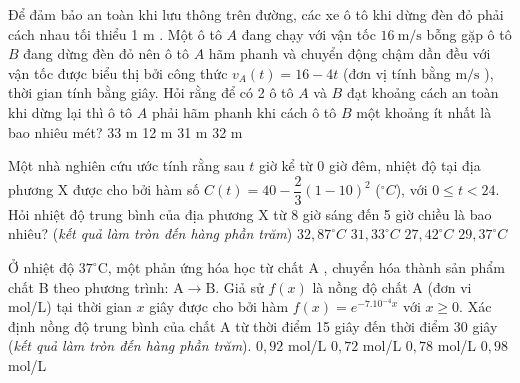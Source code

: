 \begin{ex}
	Để đảm bảo an toàn khi lưu thông trên đường, các xe ô tô khi dừng đèn đỏ phải cách nhau tối thiểu 1 m . Một ô tô $A$ đang chạy với vận tốc $16 \mathrm{~m} / \mathrm{s}$ bỗng gặp ô tô $B$ đang dừng đèn đỏ nên ô tô $A$ hãm phanh và chuyển động chậm dần đều với vận tốc được biểu thị bởi công thức $v_A(t)=16-4 t$ (đơn vị tính bằng $\mathrm{m} / \mathrm{s}$ ), thời gian tính bằng giây. Hỏi rằng để có 2 ô tô $A$ và $B$ đạt khoảng cách an toàn khi dừng lại thì ô tô $A$ phải hãm phanh khi cách ô tô $B$ một khoảng ít nhất là bao nhiêu mét?	
	\choice
	{33 m}
	{12 m}
	{31 m}
	{32 m}
\end{ex}
\begin{ex}
	Một nhà nghiên cứu ước tính rằng sau $t$ giờ kể từ $0$ giờ đêm, nhiệt độ tại địa phương X được cho bởi hàm số $C(t)=40-\dfrac{2}{3}\left(1-10 \right)^2$ ($^\circ C$), với $0 \le t <24$. Hỏi nhiệt độ trung bình của địa phương X từ 8 giờ sáng đến 5 giờ chiều là bao nhiêu? (\textit{kết quả làm tròn đến hàng phần trăm})
	\choice
	{$32,87^\circ C$}
	{\True $31,33^\circ C$}
	{$27,42^\circ C$}
	{$29,37^\circ C$}
\end{ex}
\begin{ex}
	Ở nhiệt độ $37^{\circ} \mathrm{C}$, một phản ứng hóa học từ chất A , chuyển hóa thành sản phẩm chất B theo phương trình: $\mathrm{A} \rightarrow \mathrm{B}$. Giả sử $f(x)$ là nồng độ chất A (đơn vi mol/L) tại thời gian $x$ giây được cho bởi hàm $f(x)=e^{-7.10^{-4} x}$ với $x \geq 0$. Xác định nồng độ trung bình của chất A từ thời điểm 15 giây đến thời điểm 30 giây (\textit{kết quả làm tròn đến hàng phần trăm}).
	\choice
	{$0,92$ mol/L}
	{$0,72$ mol/L}
	{$0,78$ mol/L}
	{\True $0,98$ mol/L}
\end{ex}

